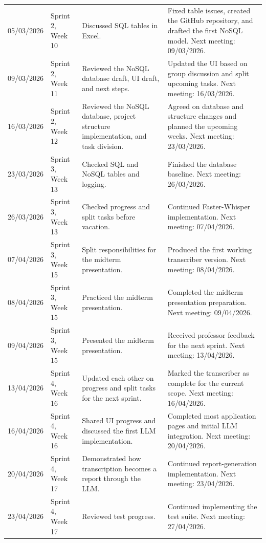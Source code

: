 \begin{longtable}{@{}P{0.13\textwidth}P{0.19\textwidth}P{0.31\textwidth}P{0.29\textwidth}@{}}
05/03/2026 & Sprint 2, Week 10 & Discussed SQL tables in Excel. & Fixed table issues, created the GitHub repository, and drafted the first NoSQL model. Next meeting: 09/03/2026. \\
09/03/2026 & Sprint 2, Week 11 & Reviewed the NoSQL database draft, UI draft, and next steps. & Updated the UI based on group discussion and split upcoming tasks. Next meeting: 16/03/2026. \\
16/03/2026 & Sprint 2, Week 12 & Reviewed the NoSQL database, project structure implementation, and task division. & Agreed on database and structure changes and planned the upcoming weeks. Next meeting: 23/03/2026. \\
23/03/2026 & Sprint 3, Week 13 & Checked SQL and NoSQL tables and logging. & Finished the database baseline. Next meeting: 26/03/2026. \\
26/03/2026 & Sprint 3, Week 13 & Checked progress and split tasks before vacation. & Continued Faster-Whisper implementation. Next meeting: 07/04/2026. \\
07/04/2026 & Sprint 3, Week 15 & Split responsibilities for the midterm presentation. & Produced the first working transcriber version. Next meeting: 08/04/2026. \\
08/04/2026 & Sprint 3, Week 15 & Practiced the midterm presentation. & Completed the midterm presentation preparation. Next meeting: 09/04/2026. \\
09/04/2026 & Sprint 3, Week 15 & Presented the midterm presentation. & Received professor feedback for the next sprint. Next meeting: 13/04/2026. \\
13/04/2026 & Sprint 4, Week 16 & Updated each other on progress and split tasks for the next sprint. & Marked the transcriber as complete for the current scope. Next meeting: 16/04/2026. \\
16/04/2026 & Sprint 4, Week 16 & Shared UI progress and discussed the first LLM implementation. & Completed most application pages and initial LLM integration. Next meeting: 20/04/2026. \\
20/04/2026 & Sprint 4, Week 17 & Demonstrated how transcription becomes a report through the LLM. & Continued report-generation implementation. Next meeting: 23/04/2026. \\
23/04/2026 & Sprint 4, Week 17 & Reviewed test progress. & Continued implementing the test suite. Next meeting: 27/04/2026. \\

\end{longtable}
